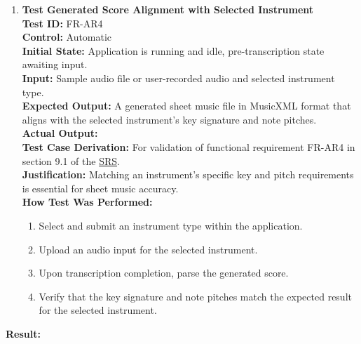 \documentclass[12pt, titlepage]{article}
\begin{document}
\begin{enumerate}
  \item \textbf{Test Generated Score Alignment with Selected Instrument} \\
    \newline
    \textbf{Test ID:} FR-AR4 \\
    \textbf{Control:} Automatic \\
    \textbf{Initial State:} Application is running and idle, pre-transcription state awaiting input. \\
    \textbf{Input:} Sample audio file or user-recorded audio and selected instrument type. \\
    \textbf{Expected Output:} A generated sheet music file in MusicXML format that aligns with the selected instrument’s key signature 
    and note pitches. \\
    \textbf{Actual Output:} \\
    \textbf{Test Case Derivation:} For validation of functional requirement FR-AR4 in section 9.1 of the 
    \href{https://github.com/emilyperica/ScoreGen/blob/main/docs/SRS-Volere/SRS.pdf}{SRS}.\\
    \textbf{Justification:} Matching an instrument's specific key and pitch requirements is essential for sheet music accuracy. \\
    \textbf{How Test Was Performed:}
    \begin{enumerate}
        \item Select and submit an instrument type within the application.
        \item Upload an audio input for the selected instrument.
        \item Upon transcription completion, parse the generated score.
        \item Verify that the key signature and note pitches match the expected result for the selected instrument.
    \end{enumerate}
  \end{enumerate}
  \textbf{Result:}
\end{document}
